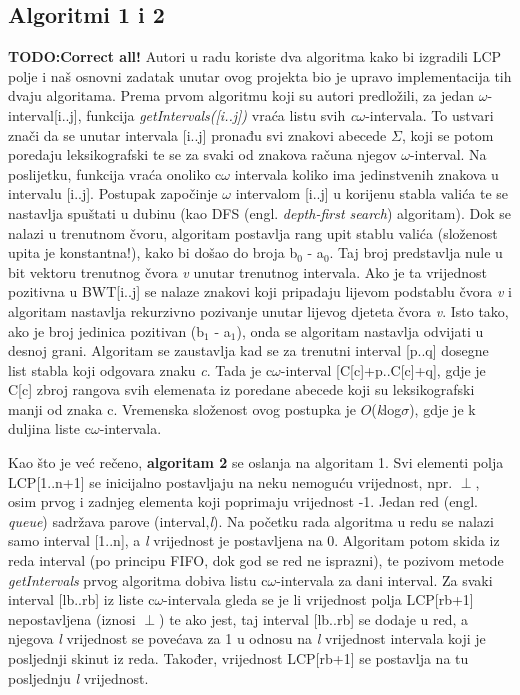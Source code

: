 \documentclass[a4paper,12pt]{article}
\begin{document}
\subsection{Algoritmi 1 i 2}
\textbf{TODO:Correct all!}
Autori u radu \cite{beller2013} koriste dva algoritma kako bi izgradili LCP polje i naš osnovni zadatak unutar ovog projekta bio je upravo implementacija tih dvaju algoritama.
Prema prvom algoritmu koji su autori predložili, za jedan $\omega$-interval[i..j], funkcija \textit{getIntervals([i..j])} vraća listu svih \textit{c$\omega$}-intervala. To ustvari znači da se unutar intervala [i..j] pronađu svi znakovi abecede $\Sigma$, koji se potom poredaju leksikografski te se za svaki od znakova računa njegov $\omega$-interval. Na poslijetku, funkcija vraća onoliko c$\omega$ intervala koliko ima jedinstvenih znakova u intervalu [i..j].
Postupak započinje $\omega$ intervalom [i..j] u korijenu stabla valića te se nastavlja spuštati u dubinu (kao DFS (engl. \textit{depth-first search}) algoritam).
Dok se nalazi u trenutnom čvoru, algoritam postavlja rang upit stablu valića (složenost upita je konstantna!), kako bi došao do broja b$_{0}$ - a$_{0}$. Taj broj predstavlja nule u bit vektoru trenutnog čvora \textit{v} unutar trenutnog intervala. Ako je ta vrijednost pozitivna u BWT[i..j] se nalaze znakovi koji pripadaju lijevom podstablu čvora \textit{v} i algoritam nastavlja rekurzivno pozivanje unutar lijevog djeteta čvora \textit{v}. Isto tako, ako je broj jedinica pozitivan (b$_1$ - a$_1$), onda se algoritam nastavlja odvijati u desnoj grani. Algoritam se zaustavlja kad se za trenutni interval [p..q] dosegne list stabla koji odgovara znaku \textit{c}. Tada je c$\omega$-interval [C[c]+p..C[c]+q], gdje je C[c] zbroj rangova svih elemenata iz poredane abecede koji su leksikografski manji od znaka c. Vremenska složenost ovog postupka je $O$(\textit{k}log$\sigma$), gdje je k duljina liste c$\omega$-intervala.

Kao što je već rečeno, \textbf{algoritam 2} se oslanja na algoritam 1. Svi elementi polja LCP[1..n+1] se inicijalno postavljaju na neku nemoguću vrijednost, npr. $\perp$, osim prvog i zadnjeg elementa koji poprimaju vrijednost -1. Jedan red (engl. \textit{queue}) sadržava parove (interval,\textit{l}). Na početku rada algoritma u redu se nalazi samo interval [1..n], a \textit{l} vrijednost je postavljena na 0. Algoritam potom skida iz reda interval (po principu FIFO, dok god se red ne isprazni), te pozivom metode \textit{getIntervals} prvog algoritma dobiva listu c$\omega$-intervala za dani interval. Za svaki interval [lb..rb] iz liste c$\omega$-intervala gleda se je li vrijednost polja LCP[rb+1] nepostavljena (iznosi $\perp$) te ako jest, taj interval [lb..rb] se dodaje u red, a njegova \textit{l} vrijednost se povećava za 1 u odnosu na \textit{l} vrijednost intervala koji je posljednji skinut iz reda. Također, vrijednost LCP[rb+1] se postavlja na tu posljednju \textit{l} vrijednost. 
\end{document}
